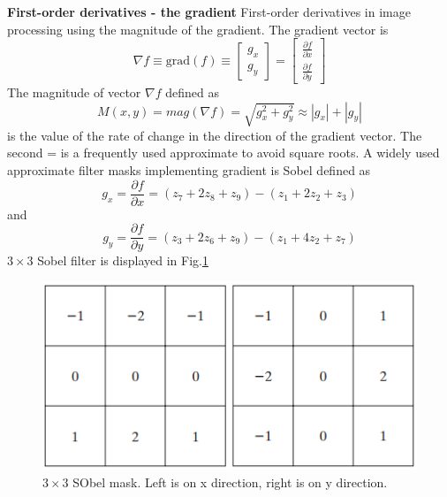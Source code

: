 \textbf{First-order derivatives - the gradient} \newline
First-order derivatives in image processing using the magnitude of the gradient. The gradient vector is \begin{equation} \nabla f \equiv \text{grad}(f) \equiv \left[ \begin{array}{c} g_x \\ g_y \end{array}\right] = \left[ \begin{array}{c} \frac{\partial f}{\partial x} \\ \frac{\partial f}{\partial y} \end{array} \right] 
\end{equation}
The magnitude of vector $\nabla f$ defined as \begin{equation}M(x,y)=mag(\nabla f) =  \sqrt{g_x^2 + g_y^2} \approx |g_x| + |g_y| \end{equation} is the value of the rate of change in the direction of the gradient vector. The second = is a frequently used approximate to avoid square roots. A widely used approximate filter masks implementing gradient is Sobel defined as \begin{equation} g_x = \frac{\partial f}{\partial x} =  (z_7+2z_8+z_9) - (z_1+2z_2+z_3)\end{equation} and \begin{equation} g_y = \frac{\partial f}{\partial y} =  (z_3+2z_6+z_9) - (z_1+4z_2+z_7)\end{equation}
$3\times 3$ Sobel filter is displayed in Fig.\ref{fig:sobel}
\begin{figure}[h!]
	\centering
	\includegraphics[scale=0.6]{myfigure/p2/sobel.png}
	\caption{$3\times 3$ SObel mask. Left is on x direction, right is on y direction.}
	\label{fig:sobel}
\end{figure}

